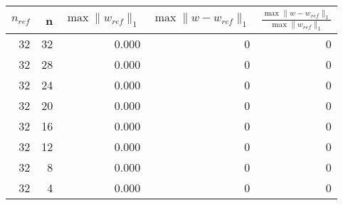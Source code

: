 \begin{tabular}{rrrrr}
\toprule
$n_{ref}$ & n & $\max \| w_{ref} \|_1$ & $\max \| w-w_{ref} \|_1$ & $\frac{\max \| w-w_{ref} \|_1}{\max \| w_{ref} \|_1}$ \\
\midrule
32 & 32 & 0.000 & 0 & 0 \\
32 & 28 & 0.000 & 0 & 0 \\
32 & 24 & 0.000 & 0 & 0 \\
32 & 20 & 0.000 & 0 & 0 \\
32 & 16 & 0.000 & 0 & 0 \\
32 & 12 & 0.000 & 0 & 0 \\
32 & 8 & 0.000 & 0 & 0 \\
32 & 4 & 0.000 & 0 & 0 \\
\bottomrule
\end{tabular}
